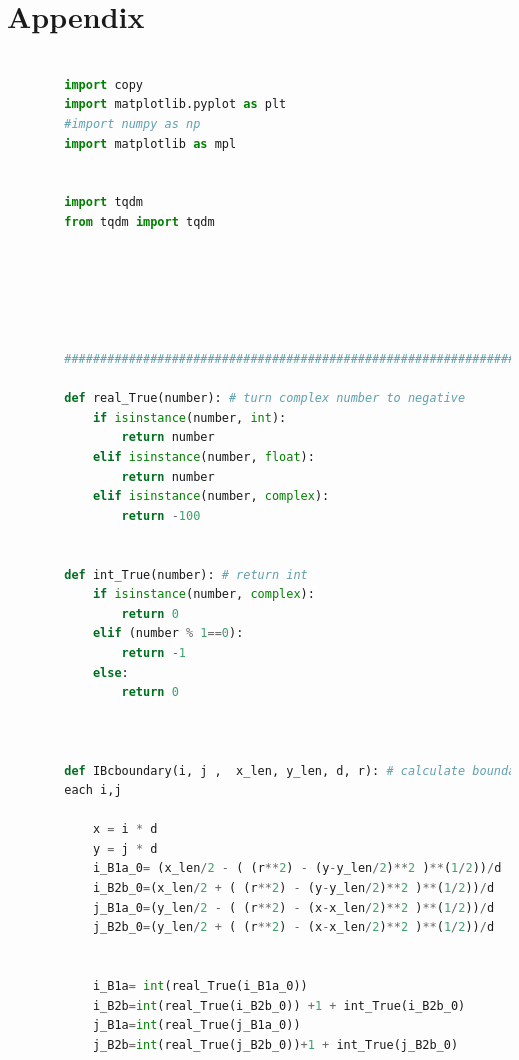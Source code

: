\documentclass[12pt]{article}
\begin{document}
\section*{Appendix}




\begin{scriptsize}
    \begin{lstlisting}[language=python,caption={Python code--Functions for Grid Generator}]
    
        import copy 
        import matplotlib.pyplot as plt
        #import numpy as np
        import matplotlib as mpl
        
        
        import tqdm
        from tqdm import tqdm
        
        
        
        
        
        
        ##########################################################################################
        
        def real_True(number): # turn complex number to negative
            if isinstance(number, int):
                return number
            elif isinstance(number, float):
                return number
            elif isinstance(number, complex):
                return -100
        
            
        def int_True(number): # return int
            if isinstance(number, complex):
                return 0
            elif (number % 1==0):
                return -1
            else:
                return 0
            
        
        
        def IBcboundary(i, j ,  x_len, y_len, d, r): # calculate boundary points for \
        each i,j
            
            x = i * d
            y = j * d
            i_B1a_0= (x_len/2 - ( (r**2) - (y-y_len/2)**2 )**(1/2))/d
            i_B2b_0=(x_len/2 + ( (r**2) - (y-y_len/2)**2 )**(1/2))/d
            j_B1a_0=(y_len/2 - ( (r**2) - (x-x_len/2)**2 )**(1/2))/d
            j_B2b_0=(y_len/2 + ( (r**2) - (x-x_len/2)**2 )**(1/2))/d
        
        
            i_B1a= int(real_True(i_B1a_0)) 
            i_B2b=int(real_True(i_B2b_0)) +1 + int_True(i_B2b_0)
            j_B1a=int(real_True(j_B1a_0))
            j_B2b=int(real_True(j_B2b_0))+1 + int_True(j_B2b_0)
        

\end{lstlisting}
\end{scriptsize}
\end{document}
